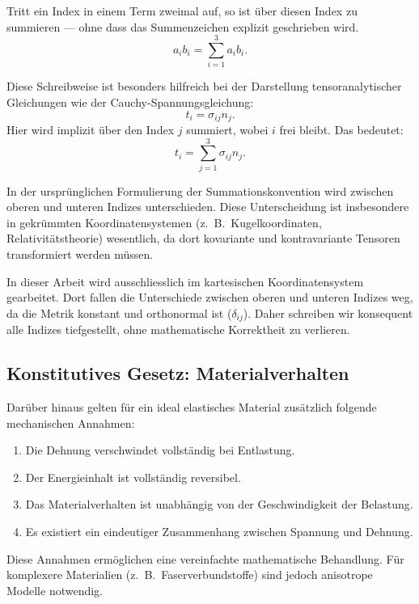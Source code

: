 \medskip
\begin{definition} 
	Tritt ein Index in einem Term zweimal auf, so ist über
	diesen Index zu summieren --- ohne dass das Summenzeichen
	explizit geschrieben wird.
\begin{equation*}
	a_i b_i = 
	\sum_{i=1}^3 a_i b_i.
\end{equation*}
\end{definition} 
Diese Schreibweise ist besonders hilfreich bei der Darstellung
tensoranalytischer Gleichungen wie der Cauchy-Spannungsgleichung:
\begin{equation*}
	t_i = 
	\sigma_{ij} n_j.
\end{equation*}
Hier wird implizit über den Index $j$ summiert, wobei $i$ frei
bleibt.
Das bedeutet:
\begin{equation*}
	t_i = 
	\sum_{j=1}^{3} \sigma_{ij} n_j.
\end{equation*}

In der ursprünglichen Formulierung der Summationskonvention wird
zwischen oberen und unteren Indizes unterschieden.
Diese Unterscheidung ist insbesondere in gekrümmten Koordinatensystemen
(z.~B.~Kugelkoordinaten, Relativitätstheorie) wesentlich, da dort
kovariante und kontravariante Tensoren transformiert werden müssen.

In dieser Arbeit wird ausschliesslich im kartesischen Koordinatensystem
gearbeitet.
Dort fallen die Unterschiede zwischen oberen und unteren Indizes
weg, da die Metrik konstant und orthonormal ist ($\delta_{ij}$).
Daher schreiben wir konsequent alle Indizes tiefgestellt, ohne
mathematische Korrektheit zu verlieren.


\subsection{Konstitutives Gesetz: Materialverhalten}
Darüber hinaus gelten für ein ideal elastisches Material zusätzlich
folgende mechanischen Annahmen:
\begin{enumerate}
	\item Die Dehnung verschwindet vollständig bei Entlastung.
	\item Der Energieinhalt ist vollständig reversibel.
	\item Das Materialverhalten ist unabhängig von der
	Geschwindigkeit der Belastung.
	\item Es existiert ein eindeutiger Zusammenhang zwischen
	Spannung und Dehnung.
\end{enumerate}
Diese Annahmen ermöglichen eine vereinfachte mathematische Behandlung. 
Für komplexere Materialien (z.~B.~Faserverbundstoffe) sind jedoch
%
anisotrope Modelle notwendig.

